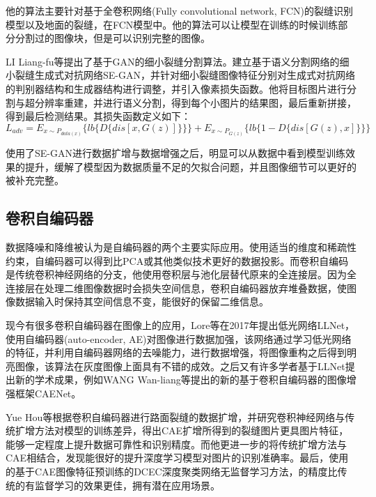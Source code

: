 \documentclass[a4paper,UTF8]{article}
\theoremstyle{definition}
\begin{document}
    他的算法主要针对基于全卷积网络(Fully convolutional network, FCN)的裂缝识别模型以及地面的裂缝，在FCN模型中。他的算法可以让模型在训练的时候训练部分分割过的图像块，但是可以识别完整的图像。
    
    LI Liang-fu等提出了基于GAN的细小裂缝分割算法\cite{15}\cite{16}。建立基于语义分割网络的细小裂缝生成式对抗网络SE-GAN，并针对细小裂缝图像特征分别对生成式对抗网络的判别器结构和生成器结构进行调整，并引入像素损失函数。他将目标图片进行分割与超分辨率重建，并进行语义分割，得到每个小图片的结果图，最后重新拼接，得到最后检测结果。其损失函数定义如下：
    \begin{equation}
    L_{adv} = E_{x \sim P_{data(x)}}\{lb\{D\{dis[x,G(z)]\}\}\} + E_{x \sim P_{G(z)}}\{lb\{1 - D\{dis[G(z),x]\}\}\}
    \end{equation}
    
    使用了SE-GAN进行数据扩增与数据增强之后，明显可以从数据中看到模型训练效果的提升，缓解了模型因为数据质量不足的欠拟合问题，并且图像细节可以更好的被补充完整。
    \subsection{卷积自编码器}
    数据降噪和降维被认为是自编码器的两个主要实际应用。使用适当的维度和稀疏性约束，自编码器可以得到比PCA或其他类似技术更好的数据投影。而卷积自编码是传统卷积神经网络的分支，他使用卷积层与池化层替代原来的全连接层。因为全连接层在处理二维图像数据时会损失空间信息，卷积自编码器放弃堆叠数据，使图像数据输入时保持其空间信息不变，能很好的保留二维信息。
    
    现今有很多卷积自编码器在图像上的应用，Lore等\cite{18}在2017年提出低光网络LLNet，使用自编码器(auto-encoder, AE)对图像进行数据加强，该网络通过学习低光网络的特征，并利用自编码器网络的去噪能力，进行数据增强，将图像重构之后得到明亮图像，该算法在灰度图像上面具有不错的成效。之后又有许多学者基于LLNet提出新的学术成果，例如WANG Wan-liang等提出的新的基于卷积自编码器的图像增强框架CAENet\cite{19}。
    
    Yue Hou等根据卷积自编码器进行路面裂缝的数据扩增\cite{1}，并研究卷积神经网络与传统扩增方法对模型的训练差异，得出CAE扩增所得到的裂缝图片更具图片特征，能够一定程度上提升数据可靠性和识别精度。而他更进一步的将传统扩增方法与CAE相结合，发现能很好的提升深度学习模型对图片的识别准确率。最后，使用的基于CAE图像特征预训练的DCEC深度聚类网络无监督学习方法，的精度比传统的有监督学习的效果更佳，拥有潜在应用场景。
    
\end{document}
